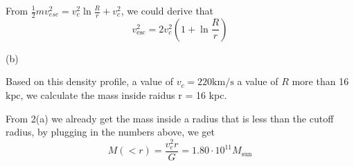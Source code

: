 \documentclass{article}
\begin{document}
From $
\frac{1}{2}m v_{esc}^2= v_c^2 \ln\frac{R}{r} + v_c^2
$, we could derive that
$$
v_{\mathrm{esc}}^{2}=2 v_{c}^{2}\left(1+\ln \frac{R}{r}\right)
$$

(b)

Based on this density profile, a value of $v_{c}=220 \mathrm{km} / \mathrm{s}$ a value of $R$ more than 16 $\mathrm{kpc}$, we calculate the mass inside raidus r = 16 kpc. 

From 2(a) we already get the mass inside a radius that is less than the cutoff radius, by plugging in the numbers above, we get 
$$
M(<r) = \frac{v_c^2 r}{G} = 1.80 \cdot 10^{11} M_{\mathrm{sun}}
$$
\end{document}
